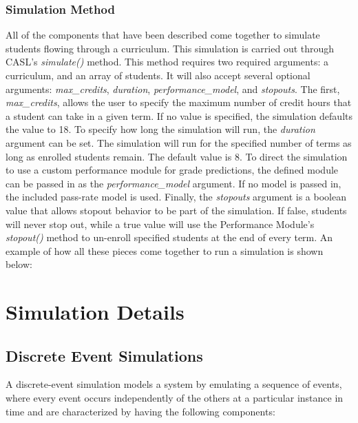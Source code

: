 \documentclass[botnum, fleqn]{unmeethesis}
\begin{document}
    \subsection{Simulation Method}
      All of the components that have been described come together to simulate students flowing through a curriculum. This simulation is carried out through CASL's \textit{simulate()} method. This method requires two required arguments: a curriculum, and an array of students. It will also accept several optional arguments: \textit{max\_credits}, \textit{duration}, \textit{performance\_model}, and \textit{stopouts}. The first, \textit{max\_credits}, allows the user to specify the maximum number of credit hours that a student can take in a given term. If no value is specified, the simulation defaults the value to 18. To specify how long the simulation will run, the \textit{duration} argument can be set. The simulation will run for the specified number of terms as long as enrolled students remain. The default value is 8. To direct the simulation to use a custom performance module for grade predictions, the defined module can be passed in as the \textit{performance\_model} argument. If no model is passed in, the included pass-rate model is used. Finally, the \textit{stopouts} argument is a boolean value that allows stopout behavior to be part of the simulation. If false, students will never stop out, while a true value will use the Performance Module's \textit{stopout()} method to un-enroll specified students at the end of every term. An example of how all these pieces come together to run a simulation is shown below:

      


\chapter{Simulation Details}

  \section{Discrete Event Simulations}
    A discrete-event simulation models a system by emulating a sequence of events, where every event occurs independently of the others at a particular instance in time and are characterized by having the following components:
\end{document}
